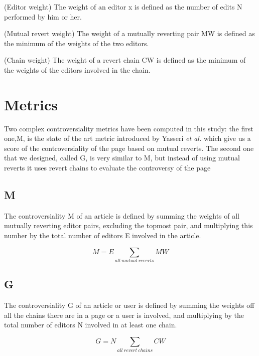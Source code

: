 \begin{definition}
    (Editor weight) The weight of an editor x is defined as the number of edits N performed by him or her.
\end{definition}

\begin{definition}
    (Mutual revert weight) The weight of a mutually reverting pair MW is defined as the minimum of the weights of the two editors.
\end{definition}

\begin{definition}
    (Chain weight) The weight of a revert chain CW is defined as the minimum of the weights of the editors involved in the chain.
\end{definition}


\section{Metrics}
Two complex controversiality metrics have been computed in this study: the first one,M, is the state of the
art metric introduced by Yasseri \textit{et al.} which give us a score of the controversiality of the page
based on mutual reverts. The second one that we designed, called G, is very similar to M, but
instead of using mutual reverts it uses revert chains to evaluate the controversy of the page  

\subsection{M}
The controversiality M of an article is defined by summing the weights of all mutually reverting
editor pairs, excluding the topmost pair, and multiplying this number by the total number of editors
E involved in the article.

\begin{equation}
    M = E   \sum_{all\ mutual\ reverts} MW
\end{equation}

\subsection{G}
The controversiality G of an article or user is defined by summing the weights off all the chains
there are in a page or a user is involved, and multiplying by the total number of editors N involved in at least one chain.

\begin{equation}
    G = N \sum_{all\ revert\ chains} CW
\end{equation}




